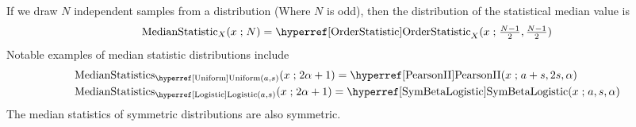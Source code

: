 

 If we draw $N$ independent samples from a distribution (Where $N$ is odd), then the distribution of the statistical median value is 
\label{MedianStatistic}
\begin{align*}
\op{MedianStatistic}_{X}(x \given N) = \opr{OrderStatistic}_{X}(x \given \tfrac{N-1}{2},  \tfrac{N-1}{2}) 
\end{align*}
Notable examples of median statistic distributions include
\begin{align*}
\op{MedianStatistics}&_{\opr{Uniform}(a,s)}(x \given 2 \alpha +1 )
=  \opr{PearsonII}(x\given a+s, 2s, \alpha) 
\\
\op{MedianStatistics}&_{\opr{Logistic}(a,s)}  (x \given 2 \alpha +1 )
=  \opr{SymBetaLogistic}(x\given a, s, \alpha)
\end{align*}
The median statistics of symmetric distributions are also symmetric.



